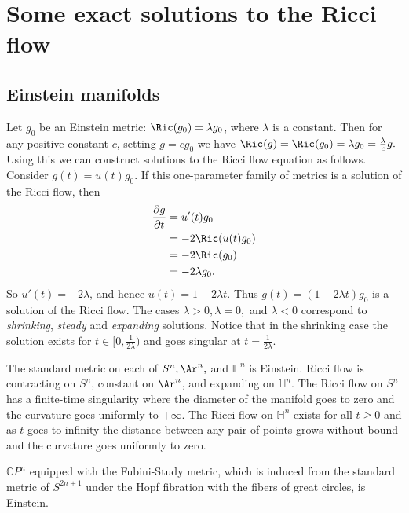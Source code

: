 \section{Some exact solutions to the Ricci flow}

\subsection{Einstein manifolds}
Let $g_0$ be an Einstein metric: $\Ric(g_0) = \lambda g_0$, where $\lambda$ is a constant. Then for
any positive constant $c$, setting $g = cg_0$ we have $\Ric(g)
= \Ric(g_0) = \lambda g_0= \frac{\lambda}{c} g.$ Using this we
can construct solutions to the Ricci flow equation as follows.
Consider $g(t) = u(t)g_{0}$. If this one-parameter family of
metrics is a solution of the Ricci flow, then
\begin{align*}
\frac{\partial g}{\partial t}& =u'(t)g_{0}\\& = -2\Ric(u(t)g_{0})\\&
= -2\Ric(g_{0})\\& = -2\lambda g_{0}.
\end{align*}
So $u'(t)= -2\lambda$,  and hence $u(t) = 1-2 \lambda t$. Thus
$g(t)= (1-2 \lambda t)g_{0}$ is a solution of the Ricci flow. The
cases $\lambda
>0, \lambda=0,$ and $\lambda< 0$ correspond to \textit{shrinking}, \textit{steady}
and \textit{expanding} solutions. Notice that in the shrinking case the
solution exists for $t\in [0,\frac{1}{2\lambda})$ and goes singular at
$t=\frac{1}{2\lambda}$.

\begin{example}\label{ex:einstein-ricci-flow}

The standard metric on each of $S^{n}, \Ar^{n},$ and ${\mathbb
H}^{n}$ is Einstein. Ricci flow is contracting on $S^n$, constant on
$\Ar^n$, and expanding on ${\mathbb H}^n$. The Ricci flow on $S^n$
has a finite-time singularity where the diameter of the manifold
goes to zero and the curvature goes uniformly to $+\infty$. The
Ricci flow on ${\mathbb H}^n$ exists for all $t\ge 0$ and as $t$
goes to infinity the distance between any pair of points grows
without bound and the curvature goes uniformly to zero.
\end{example}

\begin{example}\label{ex:fubini-study-metric}

$\mathbb{C}P^{n}$ equipped with the Fubini-Study metric, which is induced
from the standard metric of $S^{2n+1}$ under the Hopf fibration with the fibers
of great circles, is Einstein.
\end{example}


